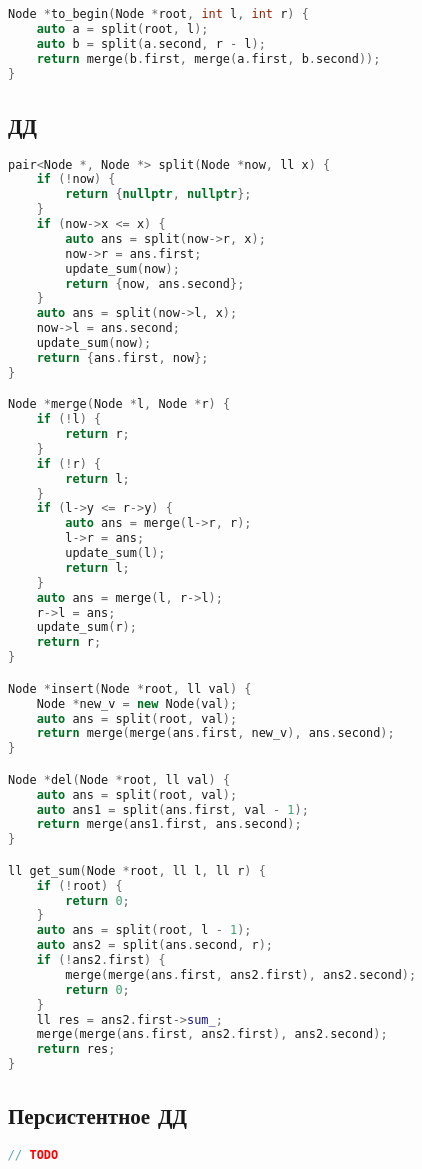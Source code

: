 \documentclass[10pt,a4paper,landscape,twosided]{extarticle}
\begin{document}
\begin{multicols*}{3}
\begin{lstlisting}[language=C++]
Node *to_begin(Node *root, int l, int r) {
    auto a = split(root, l);
    auto b = split(a.second, r - l);
    return merge(b.first, merge(a.first, b.second));
}

\end{lstlisting}

\subsection{ДД}
\begin{lstlisting}[language=C++]
pair<Node *, Node *> split(Node *now, ll x) {
    if (!now) {
        return {nullptr, nullptr};
    }
    if (now->x <= x) {
        auto ans = split(now->r, x);
        now->r = ans.first;
        update_sum(now);
        return {now, ans.second};
    }
    auto ans = split(now->l, x);
    now->l = ans.second;
    update_sum(now);
    return {ans.first, now};
}

Node *merge(Node *l, Node *r) {
    if (!l) {
        return r;
    }
    if (!r) {
        return l;
    }
    if (l->y <= r->y) {
        auto ans = merge(l->r, r);
        l->r = ans;
        update_sum(l);
        return l;
    }
    auto ans = merge(l, r->l);
    r->l = ans;
    update_sum(r);
    return r;
}

Node *insert(Node *root, ll val) {
    Node *new_v = new Node(val);
    auto ans = split(root, val);
    return merge(merge(ans.first, new_v), ans.second);
}

Node *del(Node *root, ll val) {
    auto ans = split(root, val);
    auto ans1 = split(ans.first, val - 1);
    return merge(ans1.first, ans.second);
}

ll get_sum(Node *root, ll l, ll r) {
    if (!root) {
        return 0;
    }
    auto ans = split(root, l - 1);
    auto ans2 = split(ans.second, r);
    if (!ans2.first) {
        merge(merge(ans.first, ans2.first), ans2.second);
        return 0;
    }
    ll res = ans2.first->sum_;
    merge(merge(ans.first, ans2.first), ans2.second);
    return res;
}

\end{lstlisting}

\subsection{Персистентное ДД}
\begin{lstlisting}[language=C++]
// TODO

\end{lstlisting}


\end{multicols*}
\end{document}

